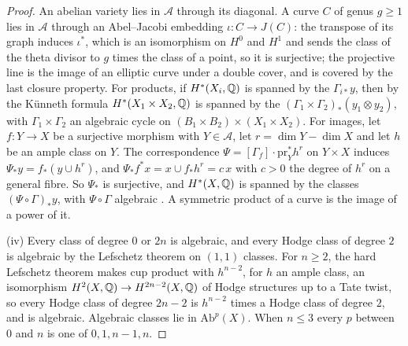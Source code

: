 \begin{proof}
An abelian variety lies in $\mathcal{A}$ through its diagonal. A curve $C$
of genus $g\ge1$ lies in $\mathcal{A}$ through an Abel--Jacobi embedding
$\iota\colon C\to J(C)$: the transpose of its graph induces $\iota^{*}$,
which is an isomorphism on $H^{0}$ and $H^{1}$ and sends the class of the
theta divisor to $g$ times the class of a point, so it is surjective; the
projective line is the image of an elliptic curve under a double cover, and
is covered by the last closure property. For products, if $H^{*}(X_{i},\mathbb{Q})$
is spanned by the $\Gamma_{i*}y$, then by the K\"unneth formula
$H^{*}(X_{1}\times X_{2},\mathbb{Q})$ is spanned by the
$(\Gamma_{1}\times\Gamma_{2})_{*}(y_{1}\otimes y_{2})$, with
$\Gamma_{1}\times\Gamma_{2}$ an algebraic cycle on
$(B_{1}\times B_{2})\times(X_{1}\times X_{2})$. For images, let
$f\colon Y\to X$ be a surjective morphism with $Y\in\mathcal{A}$, let
$r=\dim Y-\dim X$ and let $h$ be an ample class on $Y$. The correspondence
$\Psi=[\Gamma_{f}]\cdot\mathrm{pr}_{Y}^{*}h^{r}$ on $Y\times X$ induces
$\Psi_{*}y=f_{*}(y\cup h^{r})$, and
$\Psi_{*}f^{*}x=x\cup f_{*}h^{r}=c\,x$ with $c>0$ the degree of $h^{r}$ on a
general fibre. So $\Psi_{*}$ is surjective, and $H^{*}(X,\mathbb{Q})$ is spanned by
the classes $(\Psi\circ\Gamma)_{*}y$, with $\Psi\circ\Gamma$ algebraic
\cite[Chapter~16]{Ful98}. A symmetric product of a curve is the image of a
power of it.

(iv) Every class of degree $0$ or $2n$ is algebraic, and every Hodge class of
degree $2$ is algebraic by the Lefschetz theorem on $(1,1)$ classes. For
$n\ge2$, the hard Lefschetz theorem makes cup product with $h^{n-2}$, for $h$
an ample class, an isomorphism $H^{2}(X,\mathbb{Q})\to H^{2n-2}(X,\mathbb{Q})$ of Hodge
structures up to a Tate twist, so every Hodge class of degree $2n-2$ is
$h^{n-2}$ times a Hodge class of degree $2$, and is algebraic. Algebraic
classes lie in $\mathrm{Ab}^{p}(X)$. When $n\le3$ every $p$ between $0$ and
$n$ is one of $0,1,n-1,n$.
\end{proof}


